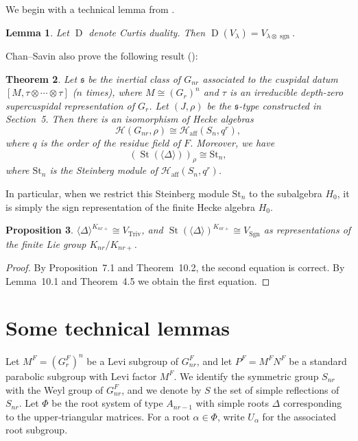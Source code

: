 \documentclass[12pt]{article}
\newtheorem{theorem}{Theorem}[section]
\newtheorem{lemma}[theorem]{Lemma}
\newtheorem{proposition}[theorem]{Proposition}
\theoremstyle{remark}
\begin{document}
We begin with a technical lemma from \cite[Proposition 7.2.13]{DigneMichel2020}.
\begin{lemma}
Let $\operatorname{D}$ denote Curtis duality. Then $\operatorname{D}(V_{\lambda}) = V_{\lambda \otimes \operatorname{sgn}}$.
\end{lemma}

Chan--Savin also prove the following result (\cite[Theorem 3.3]{ChanSavin2019}):

\begin{theorem}
\label{thm:BK-type}
Let $\mathfrak{s}$ be the inertial class of $G_{nr}$ associated to the cuspidal datum $[M, \tau \otimes \cdots \otimes \tau]$ ($n$ times), where $M \cong (G_r)^n$ and $\tau$ is an irreducible depth-zero supercuspidal representation of $G_r$. Let $(J,\rho)$ be the $\mathfrak{s}$-type constructed in Section~5. Then there is an isomorphism of Hecke algebras
$$
\mathcal{H}(G_{nr},\rho) \cong \mathcal{H}_{\mathrm{aff}}(S_n, q^r),
$$
where $q$ is the order of the residue field of $F$. Moreover, we have
$$
(\operatorname{St}(\langle\Delta\rangle))_{\rho} \cong \mathrm{St}_n,
$$
where $\mathrm{St}_n$ is the Steinberg module of $\mathcal{H}_{\mathrm{aff}}(S_n, q^r)$.
\end{theorem}

In particular, when we restrict this Steinberg module $\mathrm{St}_n$ to the subalgebra $H_0$, it is simply the sign representation of the finite Hecke algebra $H_0$.

\begin{proposition}
$\langle\Delta\rangle^{K_{nr+}} \cong V_{\mathrm{Triv}}$, and $\operatorname{St}(\langle\Delta\rangle)^{K_{nr+}} \cong V_{\mathrm{Sgn}}$ as representations of the finite Lie group $K_{nr}/K_{nr+}$.
\end{proposition}
\begin{proof}
By Proposition~7.1 and Theorem~10.2, the second equation is correct. By Lemma~10.1 and Theorem~4.5 we obtain the first equation.
\end{proof}

\section{Some technical lemmas}

Let $M^F = (G_r^F)^n$ be a Levi subgroup of $G_{nr}^F$, and let $P^F = M^F N^F$ be a standard parabolic subgroup with Levi factor $M^F$. We identify the symmetric group $S_{nr}$ with the Weyl group of $G_{nr}^F$, and we denote by $S$ the set of simple reflections of $S_{nr}$. Let $\Phi$ be the root system of type $A_{nr-1}$ with simple roots $\Delta$ corresponding to the upper‑triangular matrices. For a root $\alpha\in\Phi$, write $U_\alpha$ for the associated root subgroup.
\end{document}
